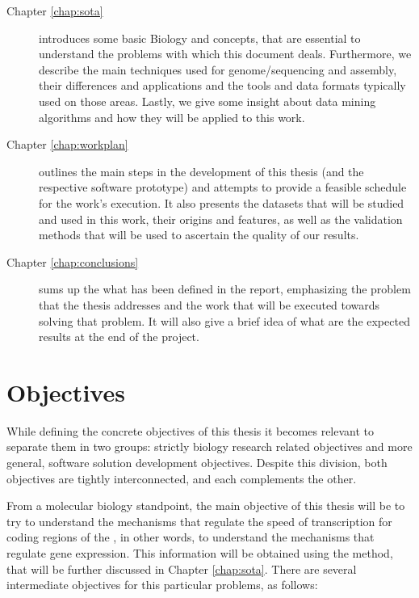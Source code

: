 \begin{description}

  \item[Chapter \ref{chap:sota}]
  introduces some basic Biology and \rnaseq{} concepts, that are essential to
  understand the problems with which this document deals. Furthermore, we
  describe the main techniques used for genome/\trans sequencing and assembly,
  their differences and applications and the tools and data formats typically
  used on those areas. Lastly, we give some insight about data mining algorithms
  and how they will be applied to this work.

  \item[Chapter \ref{chap:workplan}]
  outlines the main steps in the development of this thesis (and the respective
  software prototype) and attempts to provide a feasible schedule for the work's
  execution. It also presents the datasets that will be studied and used in this
  work, their origins and features, as well as the validation methods that will
  be used to ascertain the quality of our results.

  \item[Chapter \ref{chap:conclusions}]
  sums up the what has been defined in the report, emphasizing the problem that
  the thesis addresses and the work that will be executed towards solving that
  problem. It will also give a brief idea of what are the expected results at
  the end of the project.

\end{description}

\section{Objectives} \label{sec:goals}

While defining the concrete objectives of this thesis it becomes relevant to
separate them in two groups: strictly biology research related objectives and
more general, software solution development objectives. Despite this division,
both objectives are tightly interconnected, and each complements the other.

From a molecular biology standpoint, the main objective of this thesis will be
to try to understand the mechanisms that regulate the speed of transcription for
coding regions of the \dna, in other words, to understand the mechanisms that
regulate gene expression. This information will be obtained using the \rnaseq{}
method, that will be further discussed in Chapter \ref{chap:sota}. There are
several intermediate objectives for this particular problems, as follows:

